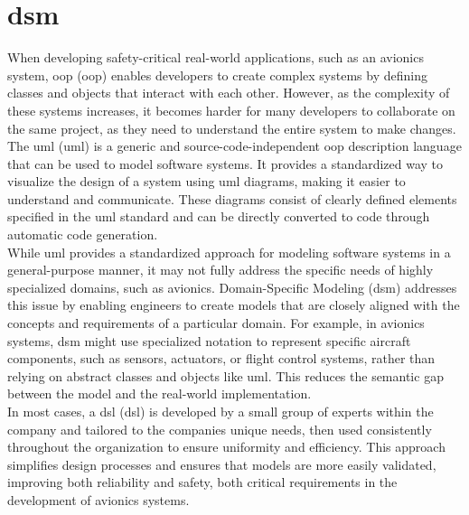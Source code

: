 \section{\acrlong{dsm}}
\label{sec:domain_specific_modeling}
When developing safety-critical real-world applications, such as an avionics system, \acrlong{oop} (\acrshort{oop}) enables developers to create complex systems by defining classes and objects that interact with each other. However, as the complexity of these systems increases, it becomes harder for many developers to collaborate on the same project, as they need to understand the entire system to make changes.\\
The \acrlong{uml} (\acrshort{uml}) is a generic and source-code-independent \acrshort{oop} description language that can be used to model software systems. It provides a standardized way to visualize the design of a system using \acrshort{uml} diagrams, making it easier to understand and communicate. These diagrams consist of clearly defined elements specified in the \acrshort{uml} standard and can be directly converted to code through automatic code generation.\\
While \acrshort{uml} provides a standardized approach for modeling software systems in a general-purpose manner, it may not fully address the specific needs of highly specialized domains, such as avionics. Domain-Specific Modeling (\acrshort{dsm}) addresses this issue by enabling engineers to create models that are closely aligned with the concepts and requirements of a particular domain. For example, in avionics systems, \acrshort{dsm} might use specialized notation to represent specific aircraft components, such as sensors, actuators, or flight control systems, rather than relying on abstract classes and objects like \acrshort{uml}. This reduces the semantic gap between the model and the real-world implementation.\\
In most cases, a \acrlong{dsl} (\acrshort{dsl}) is developed by a small group of experts within the company and tailored to the companies unique needs, then used consistently throughout the organization to ensure uniformity and efficiency. This approach simplifies design processes and ensures that models are more easily validated, improving both reliability and safety, both critical requirements in the development of avionics systems.

